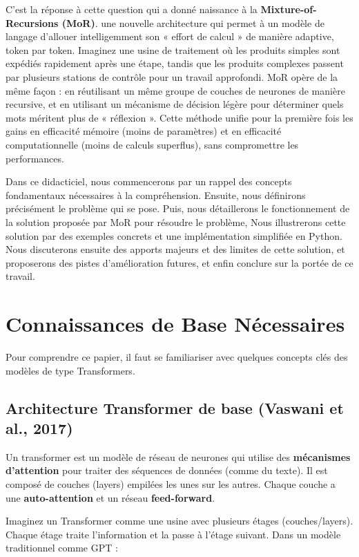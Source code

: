 \documentclass[a4paper]{article}
\begin{document}
C'est la réponse à cette question qui a donné naissance
à la \textbf{Mixture-of-Recursions (MoR)}. une nouvelle architecture
qui permet à un modèle de langage d'allouer intelligemment son « effort
de calcul » de manière adaptive, token par token. Imaginez une usine
de traitement où les produits simples sont expédiés rapidement
après une étape, tandis que les produits complexes passent
par plusieurs stations de contrôle pour un travail approfondi.
MoR opère de la même façon : en réutilisant un même groupe de couches
de neurones de manière recursive, et en utilisant un mécanisme de décision
légère pour déterminer quels mots méritent plus de « réflexion ».
Cette méthode unifie pour la première fois les gains en efficacité
mémoire (moins de paramètres) et en efficacité computationnelle
(moins de calculs superflus), sans compromettre les performances.

Dans ce didacticiel, nous commencerons par un rappel des concepts
fondamentaux nécessaires à la compréhension. Ensuite, nous définirons
précisément le problème qui se pose. Puis, nous détaillerons
le fonctionnement de la solution proposée par MoR pour résoudre le problème,
Nous illustrerons cette solution par des exemples concrets
et une implémentation simplifiée en Python.
Nous discuterons ensuite des apports majeurs et des limites de cette solution,
et proposerons des pistes d'amélioration futures,
et enfin conclure sur la portée de ce travail.

\section{Connaissances de Base Nécessaires}
\label{sec:base}
Pour comprendre ce papier, il faut se familiariser avec quelques concepts
clés des modèles de type Transformers.

\subsection{Architecture Transformer de base (Vaswani et al., 2017)}
Un transformer est un modèle de réseau de neurones qui utilise
des \textbf{mécanismes d'attention} pour traiter des séquences de données
(comme du texte). Il est composé de couches (layers)
empilées les unes sur les autres. Chaque couche a une \textbf{auto-attention}
et un réseau \textbf{feed-forward}.

Imaginez un Transformer comme une usine avec plusieurs étages (couches/layers).
Chaque étage traite l'information et la passe à l'étage suivant.
Dans un modèle traditionnel comme GPT :
\end{document}
